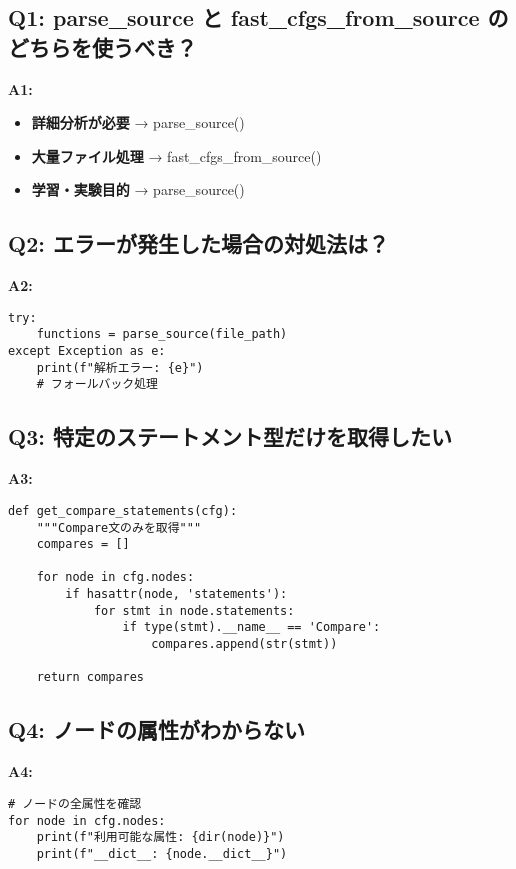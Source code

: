 \documentclass[12pt,a4paper]{article}
\begin{document}
\subsection{Q1: parse\_source と fast\_cfgs\_from\_source のどちらを使うべき？}

\textbf{A1:}
\begin{itemize}
    \item \textbf{詳細分析が必要} → parse\_source()
    \item \textbf{大量ファイル処理} → fast\_cfgs\_from\_source()
    \item \textbf{学習・実験目的} → parse\_source()
\end{itemize}

\subsection{Q2: エラーが発生した場合の対処法は？}

\textbf{A2:}
\begin{lstlisting}
try:
    functions = parse_source(file_path)
except Exception as e:
    print(f"解析エラー: {e}")
    # フォールバック処理
\end{lstlisting}

\subsection{Q3: 特定のステートメント型だけを取得したい}

\textbf{A3:}
\begin{lstlisting}
def get_compare_statements(cfg):
    """Compare文のみを取得"""
    compares = []

    for node in cfg.nodes:
        if hasattr(node, 'statements'):
            for stmt in node.statements:
                if type(stmt).__name__ == 'Compare':
                    compares.append(str(stmt))

    return compares
\end{lstlisting}

\subsection{Q4: ノードの属性がわからない}

\textbf{A4:}
\begin{lstlisting}
# ノードの全属性を確認
for node in cfg.nodes:
    print(f"利用可能な属性: {dir(node)}")
    print(f"__dict__: {node.__dict__}")
\end{lstlisting}
\end{document}
